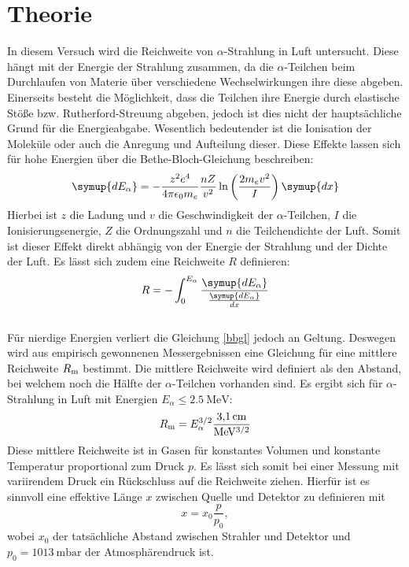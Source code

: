 \section{Theorie}
\label{sec:Theorie}
In diesem Versuch wird die Reichweite von $\alpha$-Strahlung in Luft untersucht.
Diese hängt mit der Energie der Strahlung zusammen, da die $\alpha$-Teilchen beim Durchlaufen von Materie über verschiedene Wechselwirkungen ihre diese abgeben.
Einerseits besteht die Möglichkeit, dass die Teilchen ihre Energie durch elastische Stöße bzw. Rutherford-Streuung abgeben, jedoch ist dies nicht der hauptsächliche Grund für die Energieabgabe.
Wesentlich bedeutender ist die Ionisation der Moleküle oder auch die Anregung und Aufteilung dieser. Diese Effekte lassen sich für hohe Energien über die Bethe-Bloch-Gleichung beschreiben:
\begin{equation}
	\label{bbgl}
	\symup{dE_\alpha} = -\frac{z^2e^4}{4\pi\epsilon_0m_e} \frac{nZ}{v^2} \ln\left(\frac{2m_ev^2}{I}\right) \symup{dx}
\end{equation}
Hierbei ist $z$ die Ladung und $v$ die Geschwindigkeit der $\alpha$-Teilchen, $I$ die Ionisierungsenergie, $Z$ die Ordnungszahl und $n$ die Teilchendichte der Luft.
Somit ist dieser Effekt direkt abhängig von der Energie der Strahlung und der Dichte der Luft.
Es lässt sich zudem eine Reichweite $R$ definieren:
\begin{equation}
	\label{R}
	R=-\int_0^{E_\alpha}\frac{\symup{dE_\alpha}}{\frac{\symup{dE_\alpha}}{dx}}
\end{equation}
\\
Für nierdige Energien verliert die Gleichung \eqref{bbgl} jedoch an Geltung. Deswegen wird aus empirisch gewonnenen Messergebnissen eine Gleichung für eine mittlere Reichweite $R_\text m$ bestimmt.
Die mittlere Reichweite wird definiert als den Abstand, bei welchem noch die Hälfte der $\alpha$-Teilchen vorhanden sind.
Es ergibt sich für $\alpha$-Strahlung in Luft mit Energien $E_\alpha \le \SI{2.5}{\mega\electronvolt}$:
\begin{equation}
	\label{Rm}
	R_\text m = E_\alpha^{3/2} \frac{\SI{3.1}{\centi\meter}}{\si{\mega\electronvolt}^{3/2}}
\end{equation}
Diese mittlere Reichweite ist in Gasen für konstantes Volumen und konstante Temperatur proportional zum Druck $p$.
Es lässt sich somit bei einer Messung mit variirendem Druck ein Rückschluss auf die Reichweite ziehen.
Hierfür ist es sinnvoll eine effektive Länge $x$ zwischen Quelle und Detektor zu definieren mit
\begin{equation}
	\label{xeff}
	x = x_0\frac{p}{p_0},
\end{equation}
wobei $x_0$ der tatsächliche Abstand zwischen Strahler und Detektor und $p_0 = \SI{1013}{\milli\bar}$ der Atmosphärendruck ist.
